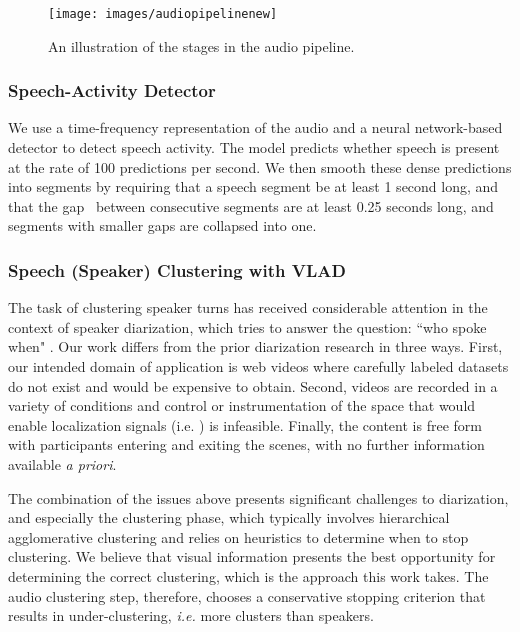 \documentclass[a4paper]{article}
\begin{document}
\begin{figure}[t]
  \texttt{[image: images/audiopipelinenew]}
  \caption{An illustration of the stages in the audio pipeline.}
  \label{fig:audiofig}
\end{figure}

\subsubsection{Speech-Activity Detector}
\label{subsubsec:sad}
We use a time-frequency representation of the audio and a neural network-based detector to detect speech activity\footnotemark.
The model predicts whether speech is present at the rate of 100 predictions per second. We then smooth these dense predictions into segments by requiring that a speech segment be at least 1 second long, and that the gap\footnotemark ~ between consecutive segments are at least 0.25 seconds long, and segments with smaller gaps are collapsed into one.

\subsubsection{Speech (Speaker) Clustering with VLAD}
\label{subsubsec:vlad}
The task of clustering speaker turns has received considerable attention in the context of speaker diarization, which tries to answer the question: ``who spoke when" \cite{Tra06, Moa12, Ang12}. Our work differs from the prior diarization research in three ways. First, our intended domain of application is web videos where carefully labeled datasets do not exist and would be expensive to obtain. Second, videos are recorded in a variety of conditions and control or instrumentation of the space that would enable localization signals (i.e. \cite{Geb15}) is infeasible. Finally, the content is free form with participants entering and exiting the scenes, with no further information available {\it a priori}. 

The combination of the issues above presents significant challenges to diarization, and especially the clustering phase, which typically involves hierarchical agglomerative clustering and relies on heuristics to determine when to stop clustering. We believe that visual information presents the best opportunity for determining the correct clustering, which is the approach this work takes. The audio clustering step, therefore, chooses a conservative stopping criterion that results in under-clustering, {\it i.e.} more clusters than speakers. 
\end{document}
